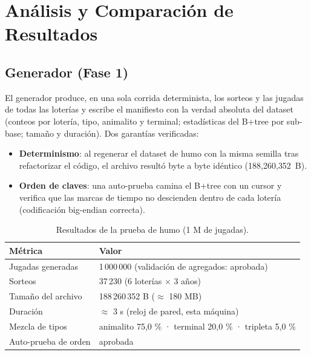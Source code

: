 \documentclass[12pt, letterpaper]{article}
\begin{document}
\section{Análisis y Comparación de Resultados}

\subsection{Generador (Fase 1)}

El generador produce, en una sola corrida determinista, los sorteos y las
jugadas de todas las loterías y escribe el manifiesto con la verdad absoluta
del dataset (conteos por lotería, tipo, animalito y terminal; estadísticas
del B+tree por sub-base; tamaño y duración). Dos garantías verificadas:

\begin{itemize}
    \item \textbf{Determinismo}: al regenerar el dataset de humo con la
    misma semilla tras refactorizar el código, el archivo resultó byte a byte
    idéntico (188{,}260{,}352~B).
    \item \textbf{Orden de claves}: una auto-prueba camina el B+tree con un
    cursor y verifica que las marcas de tiempo no descienden dentro de cada
    lotería (codificación big-endian correcta).
\end{itemize}

\begin{table}[H]
\centering
\caption{Resultados de la prueba de humo (1 M de jugadas).}
\label{tab:humo}
\begin{tabular}{@{}l l@{}}
\toprule
\textbf{Métrica} & \textbf{Valor} \\
\midrule
Jugadas generadas & 1\,000\,000 (validación de agregados: aprobada) \\
Sorteos & 37\,230 (6 loterías $\times$ 3 años) \\
Tamaño del archivo & 188\,260\,352 B ($\approx$ 180 MB) \\
Duración & $\approx$ 3 s (reloj de pared, esta máquina) \\
Mezcla de tipos & animalito 75,0 \% · terminal 20,0 \% · tripleta 5,0 \% \\
Auto-prueba de orden & aprobada \\
\bottomrule
\end{tabular}
\end{table}
\end{document}
